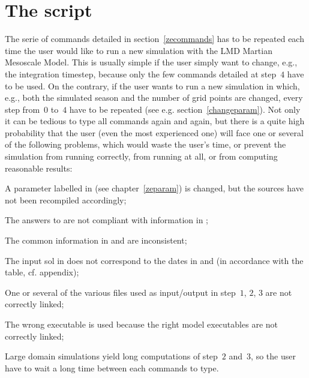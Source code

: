 \mk
\section{The  script}

\sk
The serie of commands detailed in section~\ref{zecommands} has to be repeated each time the user would like to run a new simulation with the LMD Martian Mesoscale Model. This is usually simple if the user simply want to change, e.g., the integration timestep, because only the few commands detailed at step~$4$ have to be used. On the contrary, if the user wants to run a new simulation in which, e.g., both the simulated season and the number of grid points are changed, every step from~$0$ to~$4$ have to be repeated (see e.g. section~\ref{changeparam}). Not only it can be tedious to type all commands again and again, but there is a quite high probability that the user (even the most experienced one) will face one or several of the following problems, which would waste the user's time, or prevent the simulation from running correctly, from running at all, or from computing reasonable results:
\begin{citemize}
\item A parameter labelled  in  (see chapter~\ref{zeparam}) is changed, but the sources have not been recompiled accordingly; 
\item The answers to  are not compliant with information in ;
\item The common information in  and  are inconsistent;
\item The input sol in  does not correspond to the dates in  and  (in accordance with the  table, cf. appendix);
\item One or several of the various files used as input/output in step~$1$, $2$, $3$ are not correctly linked;
\item The wrong executable is used because the right model executables are not correctly linked;
\item Large domain simulations yield long computations of step~$2$ and~$3$, so the user have to wait a long time between each commands to type.
\end{citemize}


